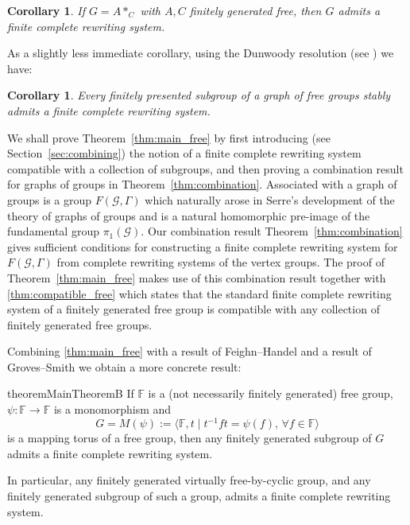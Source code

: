 \documentclass[12pt, a4paper]{amsart}
\newcommand{\F}{\mathbb{F}}
\newtheorem{corollary}[theorem]{Corollary}
\theoremstyle{definition}
\begin{document}
\begin{corollary}
\label{cor:HNN}
If $G = A*_C$ with $A, C$ finitely generated free, then $G$ admits a finite complete rewriting system.
\end{corollary}

As a slightly less immediate corollary, using the Dunwoody resolution (see \cite[Lemma 1]{BF91}) we have: 

\begin{corollary}
Every finitely presented subgroup of a graph of free groups stably admits a finite complete rewriting system.
\end{corollary}

We shall prove Theorem~\ref{thm:main_free} by first introducing (see Section~\ref{sec:combining}) the notion of a finite complete rewriting system compatible with a collection of subgroups, and then proving a combination result for graphs of groups in Theorem~\ref{thm:combination}. Associated with a graph of groups is a group $F(\mathcal{G}, \Gamma)$ which naturally arose in Serre's development of the theory of graphs of groups \cite{Serre} and is a natural homomorphic pre-image of the fundamental group $\pi_1(\mathcal{G})$. Our combination result Theorem~\ref{thm:combination} gives sufficient conditions for constructing a finite complete rewriting system for $F(\mathcal{G}, \Gamma)$ from complete rewriting systems of the vertex groups. The proof of Theorem~\ref{thm:main_free} makes use of this combination result together with \cref{thm:compatible_free} which states that the standard finite complete rewriting system of a finitely generated free group is compatible with any collection of finitely generated free groups.

Combining \cref{thm:main_free} with a result of Feighn--Handel \cite{Feighn1999} 
and a result of Groves--Smith \cite{Groves1993}
we obtain a more concrete result:

\begin{restatable}{theorem}{MainTheoremB}
\label{rewriting_main}
If $\F$ is a (not necessarily finitely generated) free group, $\psi\colon \F\to \F$ is a monomorphism and 
\[
G = M(\psi) := \langle \F, t \mid t^{-1}ft = \psi(f), \, \forall f\in \F\rangle
\]
is a mapping torus of a free group, then any finitely generated subgroup of $G$ admits a finite complete rewriting system. 

In particular, any finitely generated virtually free-by-cyclic group, and any finitely generated subgroup of such a group, admits a finite complete rewriting system. 
\end{restatable}
\end{document}
